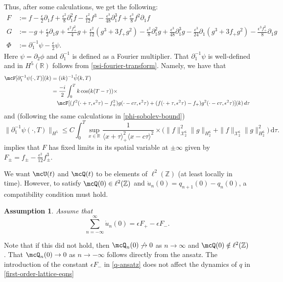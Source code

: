 \documentclass[oneside,reqno]{amsart}
\newcommand{\Z}{\mathbb{Z}}
\newcommand{\R}{\mathbb{R}}
\newtheorem{assum}{Assumption}
\begin{document}
Thus, after some calculations, we get the following:
\begin{align*}
	F &:= f - \frac{\epsilon} 2 \partial_1 f + \frac{\epsilon^2} 8 \partial_1^2 f - \frac{\epsilon^2}{12} f^3  - \frac{\epsilon^3}{48} \partial_1^3 f + \frac{\epsilon^3} 8 f^2 \partial_1 f \\
	G &:= - g + \frac{\epsilon}{2}\partial_1 g + \frac{\epsilon^2 f_+^2} 4  g + \frac{\epsilon^2}{12}(g^3 + 3f_+ g^2) -\frac{ \epsilon^2} 8 \partial_1^2 g  + \frac{\epsilon^3}{48} \partial_1^3 g  - \frac{\epsilon^3}{24} \partial_1(g^3 + 3f_+ g^2) - \frac{\epsilon^3 f_+^2} 8 \partial_1 g  \\
	\Phi &:=  \partial_1^{-1}\psi - \frac{\epsilon} 2 \psi.
\end{align*}
Here \(\psi = \partial_2 \phi\) and \(\partial_1^{-1}\) is defined as a Fourier multiplier. That \(\partial_1^{-1}\psi\) is well-defined and in \(H^5(\R)\) follows from \cref{psi-fourier-transform}. Namely, we have that 
\begin{equation*}
	\begin{aligned}
		\mcF[\partial_1^{-1} \psi(\cdot, T)](k) &= (ik)^{-1} \hat\psi(k,T) \\
		& = \frac{-i} 2 \int_0^T k \cos(k(T-\tau)) \times \\ 
		&\quad \mcF[(f^2(\cdot+\tau,\epsilon^2\tau)-f_+^2)g(\cdot-c\tau,\epsilon^2\tau) +(f(\cdot+\tau,\epsilon^2\tau)-f_+)g^2(\cdot-c\tau,\epsilon^2\tau)](k) \, d\tau
	\end{aligned}
\end{equation*}
and (following the same calculations in \cref{phi-sobolev-bound}) 
\begin{equation*}
	\| \partial_1^{-1}\psi(\cdot,T) \|_{H^5} \leq C \int_0^T \sup_{x\in\R} \frac 1 {\langle x + \tau\rangle_+^2 \langle x - c\tau\rangle^2} \times \Bigg( \|f\|^2_{\mathcal X^{6}_{2}} \| g \|_{H^{6}_2} + \|f\|_{\mathcal X^{6}_{2}} \| g \|^2_{H^{6}_2} \Bigg) \, \mathrm d \tau. 
\end{equation*} implies that \(F\) has fixed limits in its spatial variable at \(\pm \infty\) given by \(F_\pm = f_\pm -\frac{\epsilon^2}{12} f^3_{\pm}\).

We want \(\mcU(t)\) and \(\mcQ(t)\) to be elements of \(\ell^2(\Z)\) (at least locally in time). However, to satisfy \(\mcQ(0)\in\ell^2(\Z)\) and \(\dot u_n(0) = q_{n+1}(0) - q_n(0)\), a compatibility condition must hold.
\begin{assum}\label{assumption-2}
	Assume that \[\sum_{n=-\infty}^\infty \dot u_n(0) = \epsilon F_+ - \epsilon F_-.\]
\end{assum}
Note that if this did not hold, then \(\mcQ_n(0)\not\to 0\) as \(n\to\infty\) and \(\mcQ(0)\notin \ell^2(\Z)\). That \(\mcQ_n(0) \to 0\) as \(n\to-\infty\) follows directly from the ansatz. The introduction of the constant \(\epsilon F_-\) in \cref{q-ansatz} does not affect the dynamics of \(q\) in \cref{first-order-lattice-eqns}
\end{document}
